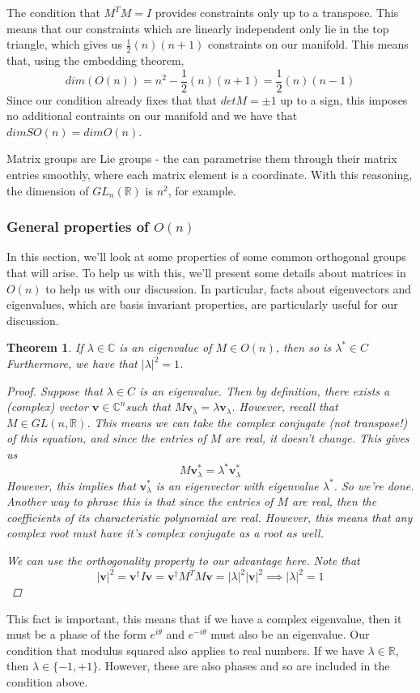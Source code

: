 \documentclass[11pt, oneside]{article}   	%
\theoremstyle{slanted}
\newtheorem*{thm}{Theorem}
\begin{document}
The condition that $M^T M = I$ provides constraints only up to a transpose. This means that our constraints which are linearly independent only lie in the top triangle, which gives us $\frac{1}{ 2} ( n ) ( n + 1 ) $ constraints on our manifold. This means that, using the embedding theorem, 
\[ 
dim ( O (n) ) = n^2  - \frac{1}{2} ( n ) ( n + 1 )  = \frac{1}{2}( n )( n - 1) 
\] 
Since our condition already fixes that that $ det M  = \pm 1 $ up to a sign, this imposes no additional contraints on our manifold and we have that 
$dim SO( n )  = dim O(n)$. 

Matrix groups are Lie groups - the can parametrise them through their matrix entries smoothly, where each matrix element is a coordinate. With this reasoning, the dimension of $GL_n(\mathbb{R})$ is $n^2$, for example. 

\subsubsection{General properties of $O(n)$ } 
In this section, we'll look at some properties of some common orthogonal groups that will arise. To help us with this, we'll present some details about matrices in $ O (n) $ to help us with our discussion. In particular, facts about eigenvectors and eigenvalues, which are basis invariant properties, are particularly useful for our discussion. 

\begin{thm}

If $\lambda \in \mathbb{C}$ is an eigenvalue of $M \in O (n) $, then so is $\lambda^* \in C$ Furthermore, we have that $|\lambda|^ 2 = 1$. 
\begin{proof} 
Suppose that $\lambda \in C$ is an eigenvalue. Then by definition, there exists a (complex) vector $\mathbf{v} \in \mathbb{ C}^n $such that $M \mathbf{v}_\lambda = \lambda \mathbf{v}_\lambda $. However, recall that $M \in GL ( n , \mathbb{ R})$. This means we can take the complex conjugate (not transpose!) of this equation, and since the entries of $M$ are real, it doesn't change. This gives us 
\[ 
M \mathbf{v}_\lambda^* = \lambda^* \mathbf{v}_\lambda^* 
\] However, this implies that $ \mathbf{v}_\lambda^*$ is an eigenvector with eigenvalue $\lambda^*$. So we're done. Another way to phrase this is that since the entries of $M $ are real, then the coefficients of its characteristic polynomial are real. However, this means that any complex root must have it's complex conjugate as a root as well. 

We can use the orthogonality property to our advantage here. Note that 
\[
	|\mathbf{v}|^2 = \mathbf{v}^\dagger I \mathbf{v} = \mathbf{v}^\dagger M^T M \mathbf{v} = |\lambda|^2 |\mathbf{v}|^2 \implies |\lambda|^2  = 1
\] 
\end{proof}
\end{thm} 
This fact is important, this means that if we have a complex eigenvalue, then it must be a phase of the form $e^{ i \theta} $ and $e^{  - i \theta} $ must also be an eigenvalue. Our condition that modulus squared also applies to real numbers. If we have $\lambda \in \mathbb{ R}$, then $\lambda \in \{ -1, + 1 \}$. However, these are also phases and so are included in the condition above. 
\end{document}
